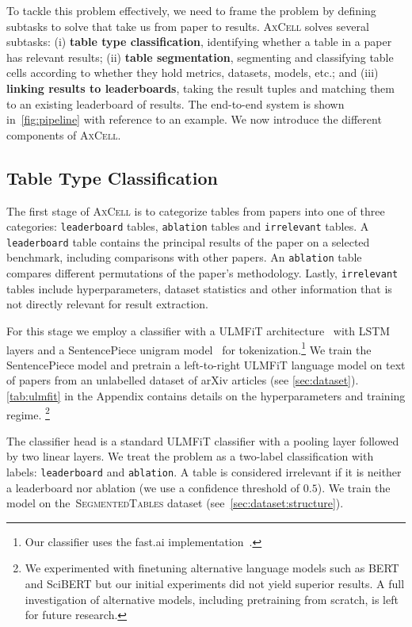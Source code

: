 \documentclass[11pt,a4paper]{article}
\newcommand{\model}{\textsc{AxCell}}
\newcommand{\finegrained}{\textsc{SegmentedTables}}
\begin{document}
To tackle this problem effectively, we need to frame the problem by defining subtasks to solve that take us from paper to results. \model{} solves several subtasks: (i) \textbf{table type classification}, identifying whether a table in a paper has relevant results; (ii) \textbf{table segmentation}, segmenting and classifying table cells according to whether they hold metrics, datasets, models, etc.; and (iii) \textbf{linking results to leaderboards}, taking the result tuples and matching them to an existing leaderboard of results. The end-to-end system is shown in~\cref{fig:pipeline} with reference to an example. We now introduce the different components of \model{}.

\subsection{Table Type Classification}
The first stage of \model{} is to categorize tables from papers into one of three categories: \texttt{leaderboard} tables, \texttt{ablation} tables and \texttt{irrelevant} tables. A \texttt{leaderboard} table contains the principal results of the paper on a selected benchmark, including comparisons with other papers. An \texttt{ablation} table compares different permutations of the paper's methodology. Lastly, \texttt{irrelevant} tables include hyperparameters, dataset statistics and other information that is not directly relevant for result extraction.

For this stage we employ a classifier with a ULMFiT architecture~\citep{ulmfit} with LSTM layers and a SentencePiece unigram model~\citep{sentencepiece} for tokenization.\footnote{Our classifier uses the fast.ai implementation~\citep{fastai}.} We train the SentencePiece model and pretrain a left-to-right ULMFiT language model on text of papers from an unlabelled dataset of arXiv articles (see \cref{sec:dataset}). \cref{tab:ulmfit} in the Appendix contains details on the hyperparameters and training regime. \footnote{We experimented with finetuning alternative language models such as BERT and SciBERT but our initial experiments did not yield superior results. A full investigation of alternative models, including pretraining from scratch, is left for future research.}


The classifier head is a standard ULMFiT classifier with a pooling layer followed by two linear layers. We treat the problem as a two-label classification with labels: \texttt{leaderboard} and \texttt{ablation}. A table is considered irrelevant if it is neither a leaderboard nor ablation (we use a confidence threshold of $0.5$). We train the model on the~\finegrained{} dataset (see~\cref{sec:dataset:structure}).
\end{document}
